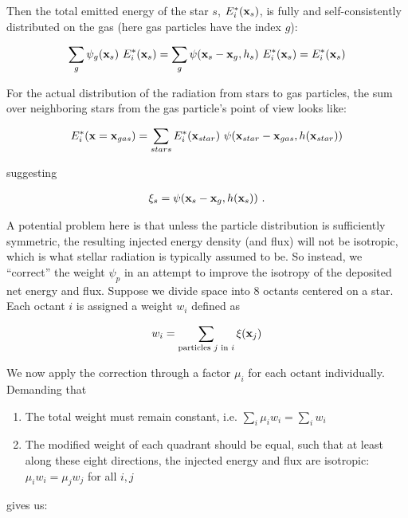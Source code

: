 Then the total emitted energy of the star $s$, $E^*_i(\mathbf{x}_s)$, is fully and self-consistently
distributed on the gas (here gas particles have the index $g$):

\begin{align}
	\sum_g \psi_g(\x_s)\  E_i^*(\x_s) = \sum_g \psi(\x_s - \x_g, h_s) \ E_i^*(\x_s) = E_i^*(\x_s)
\end{align}

For the actual distribution of the radiation from stars to gas particles, the sum over neighboring
stars from the gas particle's point of view looks like:

\begin{align}
	E^*_i (\x = \x_{gas}) = \sum_{stars} E^*_i(\x_{star}) \ \psi(\x_{star} - \x_{gas}, h(\x_{star}))
\end{align}

suggesting

\begin{align}
    \xi_s = \psi(\mathbf{x}_{s} - \mathbf{x}_{g}, h(\mathbf{x}_{s})) \ .
\end{align}


A potential problem here is that unless the particle distribution is sufficiently symmetric, the
resulting injected energy density (and flux) will not be isotropic, which is what stellar radiation
is typically assumed to be. So instead, we ``correct'' the weight $\psi_p$ in an attempt to improve
the isotropy of the deposited net energy and flux. Suppose we divide space into 8 octants centered
on a star. Each octant $i$ is assigned a weight $w_i$ defined as

\begin{align*}
 w_i = \sum\limits_{\text{particles $j$ in $i$}} \xi (\mathbf{x}_j)
\end{align*}

We now apply the correction through a factor $\mu_i$ for each octant individually.
Demanding that

\begin{enumerate}
\item The total weight must remain constant, i.e.
$\sum_i \mu_i w_i = \sum_i w_i $

\item The modified weight of each quadrant should be equal, such that at least along these eight
directions, the injected energy and flux are isotropic:
$\mu_i w_i = \mu_j w_j $ for all $i, j$

\end{enumerate}

gives us:

